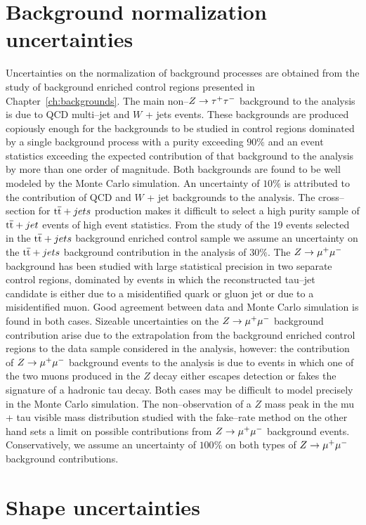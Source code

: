 \section{Background normalization uncertainties}

Uncertainties on the normalization of background processes are obtained from the
study of background enriched control regions presented in
Chapter~\ref{ch:backgrounds}.  The main non--$Z \to \tau^+\tau^-$ background to
the analysis is due to QCD multi--jet and $W$ + jets events.  These backgrounds
are produced copiously enough for the backgrounds to be studied in control
regions dominated by a single background process with a purity exceeding $90\%$
and an event statistics exceeding the expected contribution of that background
to the analysis by more than one order of magnitude.  Both backgrounds are found
to be well modeled by the Monte Carlo simulation.  An uncertainty of $10\%$ is
attributed to the contribution of QCD and $W$ + jet backgrounds to the analysis.
The cross--section for $\mathrm{t}\overline{\mathrm{t}} + jets$ production makes it difficult to select a
high purity sample of $\mathrm{t}\overline{\mathrm{t}} + jet$ events of high event statistics.  From the
study of the $19$ events selected in the $\mathrm{t}\overline{\mathrm{t}} + jets$ background enriched
control sample we assume an uncertainty on the $\mathrm{t}\overline{\mathrm{t}} + jets$ background
contribution in the analysis of $30\%$.  The $Z \to \mu^+\mu^-$ background has been
studied with large statistical precision in two separate control regions,
dominated by events in which the reconstructed tau--jet candidate is either due
to a misidentified quark or gluon jet or due to a misidentified muon.  Good
agreement between data and Monte Carlo simulation is found in both cases.
Sizeable uncertainties on the $Z \to \mu^+\mu^-$ background contribution arise due to
the extrapolation from the background enriched control regions to the data
sample considered in the analysis, however: the contribution of $Z \to \mu^+\mu^-$
background events to the analysis is due to events in which one of the two muons
produced in the $Z$ decay either escapes detection or fakes the signature of a
hadronic tau decay.  Both cases may be difficult to model precisely in the Monte
Carlo simulation.  The non--observation of a $Z$ mass peak in the mu + tau
visible mass distribution studied with the fake--rate method on the other hand
sets a limit on possible contributions from $Z \to \mu^+\mu^-$ background events.
Conservatively, we assume an uncertainty of $100\%$ on both types of $Z \to \mu^+\mu^-$
background contributions.


\section{Shape uncertainties}


